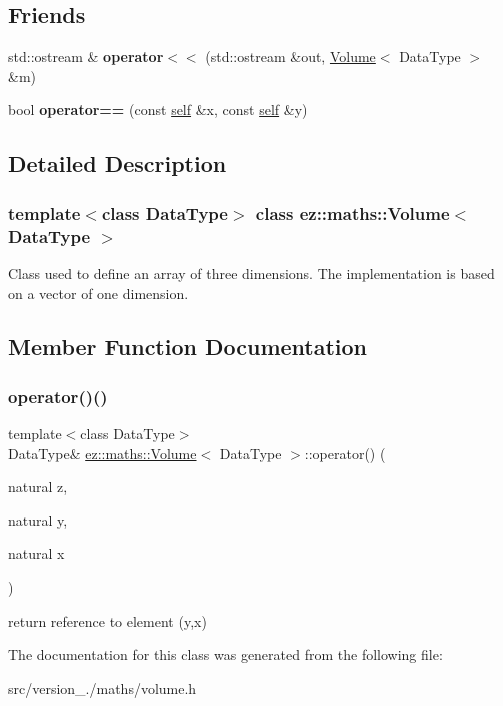 \subsection*{Friends}
\begin{DoxyCompactItemize}
\item 
\mbox{\label{classez_1_1maths_1_1Volume_aafa0d857e9814c279fdb85835a7a10d8}} 
std\+::ostream \& {\bfseries operator$<$$<$} (std\+::ostream \&out, \hyperlink{classez_1_1maths_1_1Volume}{Volume}$<$ Data\+Type $>$ \&m)
\item 
\mbox{\label{classez_1_1maths_1_1Volume_a89b571e0607100045577d5023a77342b}} 
bool {\bfseries operator==} (const \hyperlink{classez_1_1maths_1_1Volume}{self} \&x, const \hyperlink{classez_1_1maths_1_1Volume}{self} \&y)
\end{DoxyCompactItemize}


\subsection{Detailed Description}
\subsubsection*{template$<$class Data\+Type$>$\newline
class ez\+::maths\+::\+Volume$<$ Data\+Type $>$}

Class used to define an array of three dimensions. The implementation is based on a vector of one dimension. 

\subsection{Member Function Documentation}
\mbox{\label{classez_1_1maths_1_1Volume_af6447dfa426fd0fd36ab680f72b9475f}} 
\subsubsection{\texorpdfstring{operator()()}{operator()()}}
{\footnotesize\ttfamily template$<$class Data\+Type$>$ \\
Data\+Type\& \hyperlink{classez_1_1maths_1_1Volume}{ez\+::maths\+::\+Volume}$<$ Data\+Type $>$\+::operator() (\begin{DoxyParamCaption}\item[{natural}]{z,  }\item[{natural}]{y,  }\item[{natural}]{x }\end{DoxyParamCaption})\hspace{0.3cm}{\ttfamily [inline]}}

return reference to element (y,x) 

The documentation for this class was generated from the following file\+:\begin{DoxyCompactItemize}
\item 
src/version\+\_./maths/volume.\+h\end{DoxyCompactItemize}
